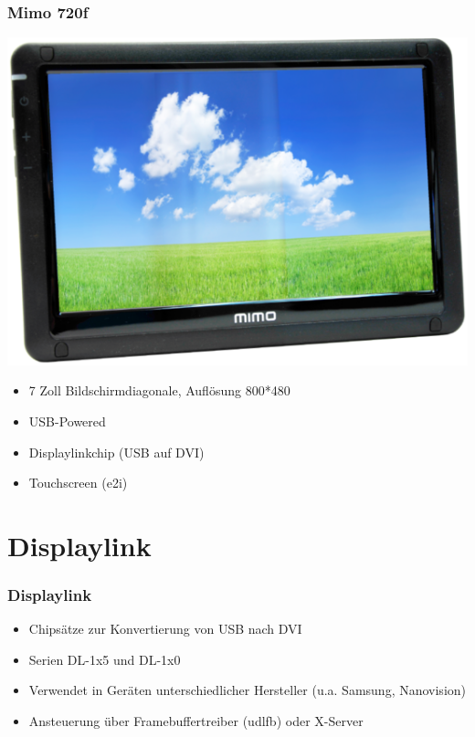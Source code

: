 \documentclass{beamer}
\begin{document}
	\begin{frame}
		\frametitle{Mimo 720f}
		\begin{center}
			\includegraphics[scale=0.3]{img/mimo720f}
		\end{center}
		
		\begin{itemize}
			\item 7 Zoll Bildschirmdiagonale, Auflösung 800*480
			\item USB-Powered
			\item Displaylinkchip (USB auf DVI)
			\item Touchscreen (e2i)
		\end{itemize}
	\end{frame}

	\section{Displaylink}
	
	\begin{frame}
		\frametitle{Displaylink}
		\begin{itemize}
			\item Chipsätze zur Konvertierung von USB nach DVI
			\item Serien DL-1x5 und DL-1x0
			\item Verwendet in Geräten unterschiedlicher Hersteller (u.a. Samsung, Nanovision)
        	\item Ansteuerung über Framebuffertreiber (udlfb) oder X-Server
		\end{itemize}	
	\end{frame}	
\end{document}
